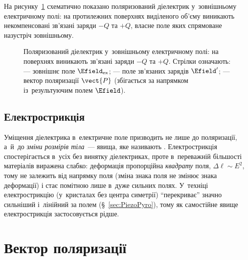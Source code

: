 На рисунку~\ref{pic:PolarizedDielectric} схематично показано поляризований діелектрик
у~зовнішньому електричному полі: на протилежних поверхнях виділеного об'єму виникають
некомпенсовані зв'язані заряди $-Q$ та $+Q$, власне поле яких спрямоване назустріч
зовнішньому.

\begin{figure}[h!]
	\centering
	\caption{Поляризований діелектрик у~зовнішньому електричному полі: на поверхнях
		виникають зв'язані заряди $-Q$ та $+Q$. Стрілки означають:
		\protect{} --- зовнішнє поле $\Efield_\text{ex}$;
		\protect{} --- поле зв'язаних зарядів $\Efield'$;
		\protect{} ---
		вектор поляризації $\vect{P}$ (збігається за напрямком із~результуючим полем $\Efield$). }
	\label{pic:PolarizedDielectric}
\end{figure}


\subsection*{Електрострикція}


Уміщення діелектрика в~електричне поле призводить не лише до поляризації, а~й~до
\emph{зміни розмірів тіла}~--- явища, яке називають .
Електрострикція спостерігається в~усіх без винятку діелектриках, проте в~переважній
більшості матеріалів виражена слабко: деформація пропорційна \emph{квадрату} поля,
$\Delta \ell \sim E^2$, тому не залежить від напрямку поля (зміна знака поля не змінює
знака деформації) і стає помітною лише в~дуже сильних полях. У~техніці електрострикцію
(у~кристалах без центра симетрії) \enquote{перекриває} значно сильніший і~лінійний за
полем  (\S~\ref{sec:PiezoPyro}), тому як самостійне
явище електрострикція застосовується рідше.


\section{Вектор поляризації}\hypertarget{polarization-vector}{}


